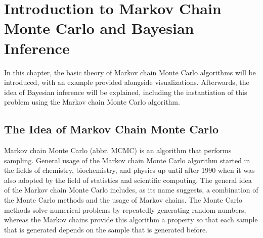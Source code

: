\chapter{Introduction to Markov Chain Monte Carlo and Bayesian Inference}

In this chapter, the basic theory of Markov chain Monte Carlo algorithms will be introduced, with an example provided alongside visualizations. Afterwards, the idea of Bayesian inference will be explained, including the instantiation of this problem using the Markov chain Monte Carlo algorithm.

\section{The Idea of Markov Chain Monte Carlo}
Markov chain Monte Carlo (abbr. MCMC) is an algorithm that performs sampling. General usage of the Markov chain Monte Carlo algorithm started in the fields of chemistry, biochemistry, and physics up until after 1990 when it was also adopted by the field of statistics and scientific computing.\cite{mcmc_handbook} The general idea of the Markov chain Monte Carlo includes, as its name suggests, a combination of the Monte Carlo methods and the usage of Markov chains. The Monte Carlo methods solve numerical problems by repeatedly generating random numbers,\cite{monte_carlo_methods} whereas the Markov chains provide this algorithm a property so that each sample that is generated depends on the sample that is generated before.\cite{mcmc_wang}

